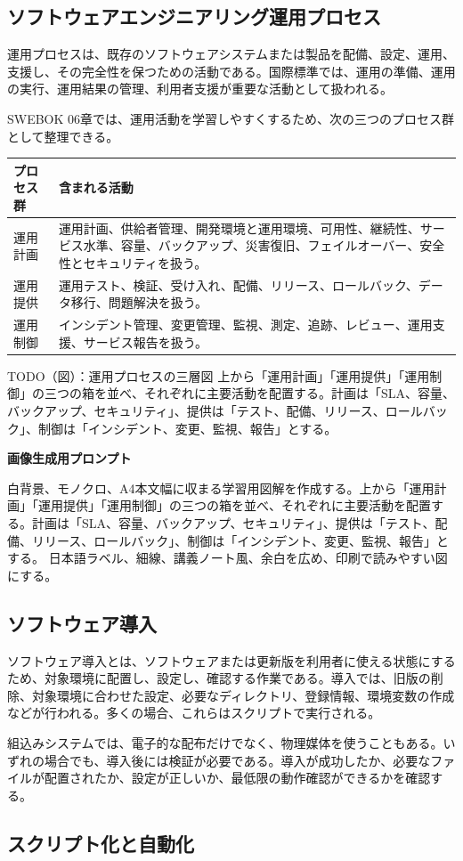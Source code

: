 \documentclass[uplatex,dvipdfmx,a4paper,10pt]{jsarticle}
\newcommand{\todoprompt}[2]{%
\begin{notebox}{TODO（図）：#1}
#2

\textbf{画像生成用プロンプト}

白背景、モノクロ、A4本文幅に収まる学習用図解を作成する。#2 日本語ラベル、細線、講義ノート風、余白を広め、印刷で読みやすい図にする。
\end{notebox}
}
\begin{document}
\subsection{ソフトウェアエンジニアリング運用プロセス}

運用プロセスは、既存のソフトウェアシステムまたは製品を配備、設定、運用、支援し、その完全性を保つための活動である。国際標準では、運用の準備、運用の実行、運用結果の管理、利用者支援が重要な活動として扱われる。

SWEBOK 06章では、運用活動を学習しやすくするため、次の三つのプロセス群として整理できる。

\begin{longtable}{L{35mm}L{115mm}}
\toprule
プロセス群 & 含まれる活動 \\
\midrule
運用計画 & 運用計画、供給者管理、開発環境と運用環境、可用性、継続性、サービス水準、容量、バックアップ、災害復旧、フェイルオーバー、安全性とセキュリティを扱う。 \\
運用提供 & 運用テスト、検証、受け入れ、配備、リリース、ロールバック、データ移行、問題解決を扱う。 \\
運用制御 & インシデント管理、変更管理、監視、測定、追跡、レビュー、運用支援、サービス報告を扱う。 \\
\bottomrule
\end{longtable}

\todoprompt{運用プロセスの三層図}{上から「運用計画」「運用提供」「運用制御」の三つの箱を並べ、それぞれに主要活動を配置する。計画は「SLA、容量、バックアップ、セキュリティ」、提供は「テスト、配備、リリース、ロールバック」、制御は「インシデント、変更、監視、報告」とする。}

\subsection{ソフトウェア導入}

ソフトウェア導入とは、ソフトウェアまたは更新版を利用者に使える状態にするため、対象環境に配置し、設定し、確認する作業である。導入では、旧版の削除、対象環境に合わせた設定、必要なディレクトリ、登録情報、環境変数の作成などが行われる。多くの場合、これらはスクリプトで実行される。

組込みシステムでは、電子的な配布だけでなく、物理媒体を使うこともある。いずれの場合でも、導入後には検証が必要である。導入が成功したか、必要なファイルが配置されたか、設定が正しいか、最低限の動作確認ができるかを確認する。

\subsection{スクリプト化と自動化}
\end{document}
